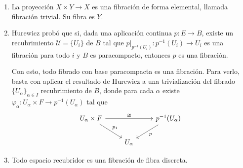 \begin{demo}
\begin{ejems}
\begin{enumerate}
\item La proyección $X \times Y \longrightarrow X$ es una fibración de forma elemental, llamada fibración trivial. Su fibra es $Y$.
\item Hurewicz probó que si, dada una aplicación continua $p: E \longrightarrow B$, existe un recubrimiento $\mathcal{U} = \{U_i\}$ de $B$ tal que $p \vert_{p^{-1}(U_i)} : p^{-1}(U_i) \longrightarrow U_i$ es una fibración para todo $i$ y $B$ es paracompacto, entonces $p$ es una fibración. \par
Con esto, todo fibrado con base paracompacta es una fibración. Para verlo, basta con aplicar el resultado de Hurewicz a una trivialización del fibrado $\{ U_\alpha \}_{\alpha \in I}$ recubrimiento de $B$, donde para cada $\alpha$ existe $\varphi_\alpha : U_\alpha \times F \longrightarrow p^{-1}(U_\alpha)$ tal que
\[
\begin{tikzcd}
U_\alpha \times F \arrow{rr}{\cong} \arrow{dr}{p_1} & & p^{-1}(U_\alpha) \arrow{ld}{p} \\
& U_\alpha &
\end{tikzcd}
\]

\item Todo espacio recubridor es una fibración de fibra discreta.
\end{enumerate}
\end{ejems}
\end{demo}

